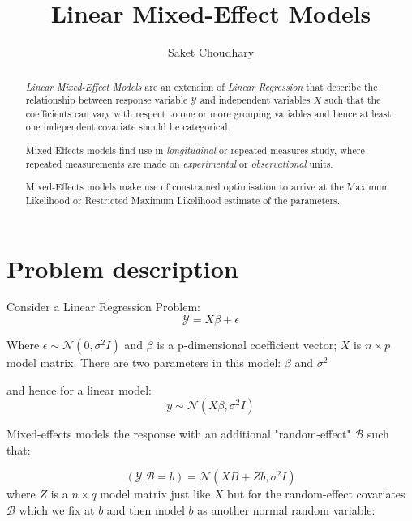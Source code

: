 \documentclass{ifacconf}
\begin{document}
\begin{frontmatter}


\title{
	Linear Mixed-Effect Models}%


\author[First]{Saket Choudhary} 




\address[First]{University of Southern California, 
   LA, CA 90089 USA (e-mail: skchoudh@ usc.edu).}


\begin{abstract}                %
\emph{Linear Mixed-Effect Models} are an extension of \emph{Linear Regression} that describe the relationship between response variable $\mathcal{Y}$ and independent variables ${X}$ such that the coefficients can vary with respect to one or more grouping variables and hence at least one independent covariate should be categorical.

Mixed-Effects models find use in \emph{longitudinal} or repeated measures study, where repeated measurements are made on \emph{experimental} or \emph{observational} units.

Mixed-Effects models make use of constrained optimisation to arrive at the Maximum Likelihood or Restricted Maximum Likelihood estimate of the parameters.

\end{abstract}


\end{frontmatter}

\section{Problem description}
Consider a Linear Regression Problem:
$$
\mathcal{Y} = X\beta + \epsilon
$$

Where $\epsilon \sim \mathcal{N}(0,\sigma^2I)$
and $\beta$ is a p-dimensional coefficient vector;
$X$ is $n \times p$ model matrix. There are two parameters
in this model: $\beta$ and $\sigma^2$

and hence for a linear model:
$$
y \sim \mathcal{N}({X\beta,\sigma^2I})
$$


Mixed-effects models the response with an additional "random-effect" $\mathcal{B}$ such that:

$$
(\mathcal{Y}|\mathcal{B}=b) = \mathcal{N}(XB+Zb, \sigma^2I)
$$
where $Z$ is a $n \times q$ model matrix just like $X$ but for the random-effect covariates $\mathcal{B}$ which we fix at $b$ and then model $b$ as another normal random variable:
\end{document}
